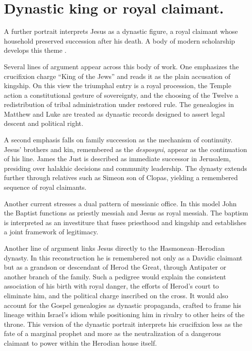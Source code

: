 \section{Dynastic king or royal claimant.}\label{sec:dynastic}

A further portrait interprets Jesus as a dynastic figure, a royal claimant whose household preserved succession after his death.
A body of modern scholarship develops this theme \cite{tabor:dynasty,eisenman:james,maccoby:revolution,thiering:jesusman,jacobovici:tomb,baigent:holyblood}.

Several lines of argument appear across this body of work.
One emphasizes the crucifixion charge ``King of the Jews'' and reads it as the plain accusation of kingship.
On this view the triumphal entry is a royal procession, the Temple action a constitutional gesture of sovereignty, and the choosing of the Twelve a redistribution of tribal administration under restored rule.
The genealogies in Matthew and Luke are treated as dynastic records designed to assert legal descent and political right.

A second emphasis falls on family succession as the mechanism of continuity.
Jesus’ brothers and kin, remembered as the \emph{desposyni}, appear as the continuation of his line.
James the Just is described as immediate successor in Jerusalem, presiding over halakhic decisions and community leadership.
The dynasty extends further through relatives such as Simeon son of Clopas, yielding a remembered sequence of royal claimants.

Another current stresses a dual pattern of messianic office.
In this model John the Baptist functions as priestly messiah and Jesus as royal messiah.
The baptism is interpreted as an investiture that fuses priesthood and kingship and establishes a joint framework of legitimacy.

Another line of argument links Jesus directly to the Hasmonean--Herodian dynasty.
In this reconstruction he is remembered not only as a Davidic claimant but as a grandson or descendant of Herod the Great, through Antipater or another branch of the family.
Such a pedigree would explain the consistent association of his birth with royal danger, the efforts of Herod’s court to eliminate him, and the political charge inscribed on the cross.
It would also account for the Gospel genealogies as dynastic propaganda, crafted to frame his lineage within Israel’s idiom while positioning him in rivalry to other heirs of the throne.
This version of the dynastic portrait interprets his crucifixion less as the fate of a marginal prophet and more as the neutralization of a dangerous claimant to power within the Herodian house itself.

